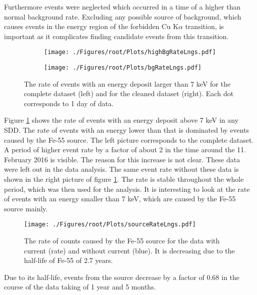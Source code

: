 Furthermore events were neglected which occurred in a time of a higher than normal background rate. Excluding any possible source of background, which causes events in the energy region of the forbidden Cu K$\alpha$ transition, is important as it complicates finding candidate events from this transition. 
\begin{figure}[h]
 \centering
 \begin{subfigure}{.49\textwidth}
 \centering
 \texttt{[image: ./Figures/root/Plots/highBgRateLngs.pdf]}
 \end{subfigure}
 \hfill
 \begin{subfigure}{.46\textwidth}
 \centering
 \texttt{[image: ./Figures/root/Plots/bgRateLngs.pdf]}
 \end{subfigure}
 \caption{The rate of events with an energy deposit larger than 7 keV for the complete dataset (left) and for the cleaned dataset (right). Each dot corresponds to 1 day of data.}
 \label{fig:bgRateLngs}
\end{figure}
Figure \ref{fig:bgRateLngs} shows the rate of events with an energy deposit above 7 keV in any SDD. The rate of events with an energy lower than that is dominated by events caused by the Fe-55 source. The left picture corresponds to the complete dataset. A period of higher event rate by a factor of about 2 in the time around the 11. February 2016 is visible. The reason for this increase is not clear. These data were left out in the data analysis. The same event rate without these data is shown in the right picture of figure \ref{fig:bgRateLngs}. The rate is stable throughout the whole period, which was then used for the analysis. It is interesting to look at the rate of events with an energy smaller than 7 keV, which are caused by the Fe-55 source mainly.
\begin{figure}[h]
 \centering
 \texttt{[image: ./Figures/root/Plots/sourceRateLngs.pdf]}
 \caption{The rate of counts caused by the Fe-55 source for the data with current (rate) and without current (blue). It is decreasing due to the half-life of Fe-55 of 2.7 years.}
 \label{fig:sourceRateLngs}
\end{figure}
Due to its half-life, events from the source decrease by a factor of 0.68 in the course of the data taking of 1 year and 5 months.


